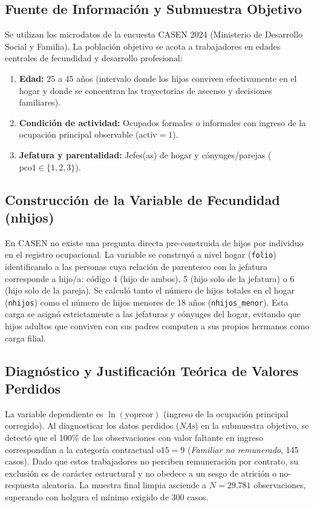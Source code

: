 \documentclass[11pt,a4paper]{article}
\begin{document}
\subsection{Fuente de Información y Submuestra Objetivo}
Se utilizan los microdatos de la encuesta CASEN 2024 (Ministerio de Desarrollo Social y Familia). La población objetivo se acota a trabajadores en edades centrales de fecundidad y desarrollo profesional:
\begin{enumerate}
    \item \textbf{Edad:} 25 a 45 años (intervalo donde los hijos conviven efectivamente en el hogar y donde se concentran las trayectorias de ascenso y decisiones familiares).
    \item \textbf{Condición de actividad:} Ocupados formales o informales con ingreso de la ocupación principal observable ($\text{activ} = 1$).
    \item \textbf{Jefatura y parentalidad:} Jefes(as) de hogar y cónyuges/parejas ($\text{pco1} \in \{1, 2, 3\}$).
\end{enumerate}

\subsection{Construcción de la Variable de Fecundidad (nhijos)}
En CASEN no existe una pregunta directa pre-construida de hijos por individuo en el registro ocupacional. La variable se construyó a nivel hogar (\texttt{folio}) identificando a las personas cuya relación de parentesco con la jefatura corresponde a hijo/a: código 4 (hijo de ambos), 5 (hijo solo de la jefatura) o 6 (hijo solo de la pareja). Se calculó tanto el número de hijos totales en el hogar (\texttt{nhijos}) como el número de hijos menores de 18 años (\texttt{nhijos\_menor}). Esta carga se asignó estrictamente a las jefaturas y cónyuges del hogar, evitando que hijos adultos que conviven con sus padres computen a sus propios hermanos como carga filial.

\subsection{Diagnóstico y Justificación Teórica de Valores Perdidos}
La variable dependiente es $\ln(\text{yoprcor})$ (ingreso de la ocupación principal corregido). Al diagnosticar los datos perdidos (\textit{NAs}) en la submuestra objetivo, se detectó que el 100\% de las observaciones con valor faltante en ingreso correspondían a la categoría contractual $\text{o15} = 9$ (\textit{Familiar no remunerado}, 145 casos). Dado que estos trabajadores no perciben remuneración por contrato, su exclusión es de carácter estructural y no obedece a un sesgo de atrición o no-respuesta aleatoria. La muestra final limpia asciende a $N = 29.781$ observaciones, superando con holgura el mínimo exigido de 300 casos.
\end{document}
